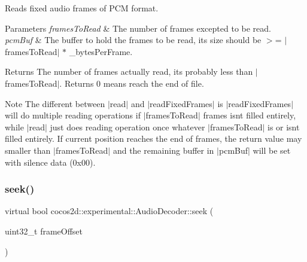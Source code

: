 Reads fixed audio frames of P\+CM format. 


\begin{DoxyParams}{Parameters}
{\em frames\+To\+Read} & The number of frames excepted to be read. \\
\hline
{\em pcm\+Buf} & The buffer to hold the frames to be read, its size should be $>$= $\vert$frames\+To\+Read$\vert$ $\ast$ \+\_\+bytes\+Per\+Frame. \\
\hline
\end{DoxyParams}
\begin{DoxyReturn}{Returns}
The number of frames actually read, it\textquotesingle{}s probably less than $\vert$frames\+To\+Read$\vert$. Returns 0 means reach the end of file. 
\end{DoxyReturn}
\begin{DoxyNote}{Note}
The different between $\vert$read$\vert$ and $\vert$read\+Fixed\+Frames$\vert$ is $\vert$read\+Fixed\+Frames$\vert$ will do multiple reading operations if $\vert$frames\+To\+Read$\vert$ frames isn\textquotesingle{}t filled entirely, while $\vert$read$\vert$ just does reading operation once whatever $\vert$frames\+To\+Read$\vert$ is or isn\textquotesingle{}t filled entirely. If current position reaches the end of frames, the return value may smaller than $\vert$frames\+To\+Read$\vert$ and the remaining buffer in $\vert$pcm\+Buf$\vert$ will be set with silence data (0x00). 
\end{DoxyNote}
\mbox{\label{classcocos2d_1_1experimental_1_1AudioDecoder_a290db97d8d4b00b6d09e145cd123b58b}} 
\subsubsection{\texorpdfstring{seek()}{seek()}\hspace{0.1cm}{\footnotesize\ttfamily [1/2]}}
{\footnotesize\ttfamily virtual bool cocos2d\+::experimental\+::\+Audio\+Decoder\+::seek (\begin{DoxyParamCaption}\item[{uint32\+\_\+t}]{frame\+Offset }\end{DoxyParamCaption})\hspace{0.3cm}{\ttfamily [pure virtual]}}



